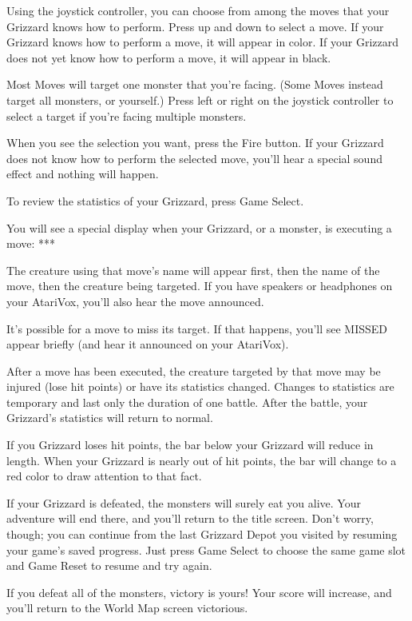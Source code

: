 \documentclass[12pt,twoside,openright,book]{memoir}
\begin{document}
Using the joystick controller, you can  choose from among the moves that
your Grizzard knows how to perform. Press  up and down to select a move.
If your Grizzard knows  how to perform a move, it  will appear in color.
If your Grizzard does not yet know how to perform a move, it will appear
in black.

Most  Moves will  target one  monster  that you're  facing. (Some  Moves
instead target  all monsters, or yourself.)  Press left or right  on the
joystick   controller   to   select    a   target   if   you're   facing
multiple monsters.

When you  see the  selection you  want, press the  Fire button.  If your
Grizzard does  not know how  to perform  the selected move,  you'll hear
a special sound effect and nothing will happen.

To review the statistics of your Grizzard, press Game Select.

You will  see a  special display  when your Grizzard,  or a  monster, is
executing a move: ***

The creature using that move's name  will appear first, then the name of
the move,  then the  creature being  targeted. If  you have  speakers or
headphones on your AtariVox, you'll also hear the move announced.

It's possible for a move to miss its target. If that happens, you'll see
MISSED appear briefly (and hear it announced on your AtariVox).

After a move  has been executed, the creature targeted  by that move may
be injured (lose hit points) or  have its statistics changed. Changes to
statistics  are temporary  and last  only  the duration  of one  battle.
After the battle, your Grizzard's statistics will return to normal.

If  you Grizzard  loses hit  points, the  bar below  your Grizzard  will
reduce in  length. When your Grizzard  is nearly out of  hit points, the
bar will change to a red color to draw attention to that fact.

If your  Grizzard is defeated, the  monsters will surely eat  you alive.
Your adventure  will end there, and  you'll return to the  title screen.
Don't worry, though;  you can continue from the last  Grizzard Depot you
visited by resuming  your game's saved progress. Just  press Game Select
to choose the same game slot and Game Reset to resume and try again.

If you  defeat all of  the monsters, victory  is yours! Your  score will
increase, and you'll return to the World Map screen victorious.
\end{document}
